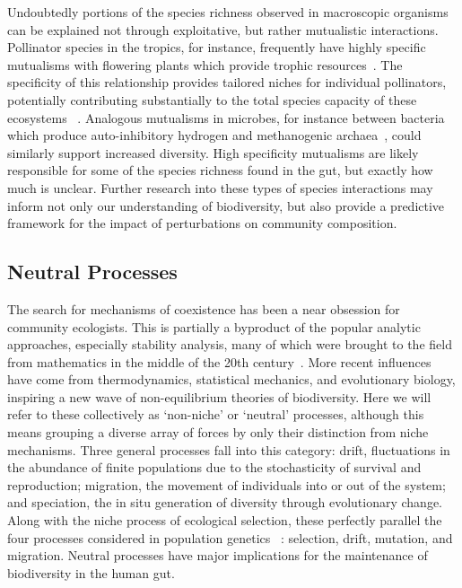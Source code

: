 \documentclass[12pt]{article}
\begin{document}
Undoubtedly portions of the species richness observed in macroscopic
organisms can be explained not through exploitative,
but rather mutualistic interactions.
Pollinator species in the tropics, for instance, frequently
have highly specific mutualisms with flowering plants which
provide trophic resources~\citep{Bawa1990}.
The specificity of this relationship provides tailored niches
for individual pollinators, potentially contributing substantially
to the total species capacity of these ecosystems%
~\citep{Burger1981,Stebbins1981}.
Analogous mutualisms in microbes, for instance
between bacteria which produce auto-inhibitory hydrogen
and methanogenic archaea~\citep{Narihiro2014},
could similarly support increased diversity.
High specificity mutualisms are likely responsible for some of the species
richness found in the gut,
but exactly how much is unclear.
Further research into these types of species interactions
may inform not only our understanding of biodiversity,
but also provide a predictive framework for the impact of
perturbations on community composition.

\subsection{Neutral Processes}
The search for mechanisms of coexistence has been a near obsession for
community ecologists.
This is partially a byproduct of the popular analytic approaches,
especially stability analysis,
many of which were brought to the field from mathematics
in the middle of the 20th century~\citep[e.g\@.][]{May1973,MacArthur1955}.
More recent influences have come from thermodynamics,
statistical mechanics, and evolutionary biology,
inspiring a new wave of non-equilibrium theories of biodiversity.
Here we will refer to these collectively as `non-niche' or `neutral'
processes,
although this means grouping a diverse array of forces by only their
distinction from niche mechanisms.
Three general processes fall into this category:
drift, fluctuations in the abundance of finite populations due to
the stochasticity of survival and reproduction;
migration, the movement of individuals into or out of the system;
and speciation, the in situ generation of diversity through
evolutionary change.
Along with the niche process of ecological selection,
these perfectly parallel the four processes considered in population genetics%
~\citep{Vellend2010}:
selection, drift, mutation, and migration.
Neutral processes have major implications for the maintenance of
biodiversity in the human gut.
\end{document}
